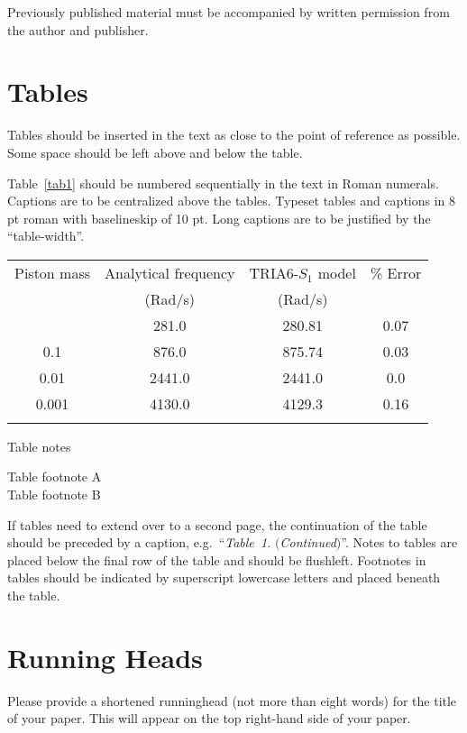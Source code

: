 \documentclass{ijcs_template}
\begin{document}
Previously published material must be accompanied by written
permission from the author and publisher.

\section{Tables}
Tables should be inserted in the text as close to the point of
reference as possible. Some space should be left above and below
the table.

Table~\ref{tab1} should be numbered sequentially in the text in
Roman numerals. Captions are to be centralized above the tables.
Typeset tables and captions in 8 pt roman with baselineskip of 10
pt. Long captions are to be justified by the ``table-width''.

\begin{table}[th]
{\begin{tabular}{@{}cccc@{}} \toprule
Piston mass & Analytical frequency & TRIA6-$S_1$ model &
\% Error \\
& (Rad/s) & (Rad/s) \\ \colrule
1.0\hphantom{00} & \hphantom{0}281.0 & \hphantom{0}280.81 & 0.07 \\
0.1\hphantom{00} & \hphantom{0}876.0 & \hphantom{0}875.74 & 0.03 \\
0.01\hphantom{0} & 2441.0 & 2441.0\hphantom{0} & 0.0\hphantom{0} \\
0.001 & 4130.0 & 4129.3\hphantom{0} & 0.16\\ \botrule
\end{tabular} }
\begin{tabnote}
Table notes
\end{tabnote}
\begin{tabfootnote}
 Table footnote A\\
 Table footnote B
\end{tabfootnote}
\end{table}

If tables need to extend over to a second page, the continuation of
the table should be preceded by a caption, e.g.~``{\it Table~1.}
$(${\it Continued}$)$''. Notes to tables are placed below the final
row of the table and should be flushleft.  Footnotes in tables
should be indicated by superscript lowercase letters and placed beneath
the table.

\section{Running Heads}
Please provide a shortened runninghead (not more than eight words) for
the title of your paper. This will appear on the top right-hand side
of your paper.
\end{document}
